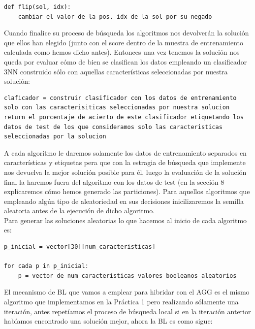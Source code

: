 \documentclass[10pt,a4paper]{article}
\begin{document}
\begin{lstlisting}
def flip(sol, idx):
	cambiar el valor de la pos. idx de la sol por su negado
\end{lstlisting}

Cuando finalice su proceso de búsqueda los algoritmos nos devolverán la solución que ellos han elegido (junto con el score dentro de la muestra de entrenamiento calculada como hemos dicho antes). Entonces una vez tenemos la solución nos queda por evaluar cómo de bien se clasifican los datos empleando un clasificador 3NN construido sólo con aquellas características seleccionadas por nuestra solución:\\

\begin{lstlisting}
claficador = construir clasificador con los datos de entrenamiento solo con las caracterisiticas seleccionadas por nuestra solucion
return el porcentaje de acierto de este clasificador etiquetando los datos de test de los que consideramos solo las caracteristicas seleccionadas por la solucion
\end{lstlisting}

A cada algoritmo le daremos solamente los datos de entrenamiento separados en características y etiquetas pera que con la estragia de búsqueda que implemente nos devuelva la mejor solución posible para él, luego la evaluación de la solución final la haremos fuera del algoritmo con los datos de test (en la sección 8 explicaremos cómo hemos generado las particiones). Para aquellos algoritmos que empleando algún tipo de aleatoriedad en sus decisiones inicilizaremos la semilla aleatoria antes de la ejecución de dicho algoritmo.\\

Para generar las soluciones aleatorias lo que hacemos al inicio de cada algoritmo es:\\

\begin{lstlisting}
p_inicial = vector[30][num_caracteristicas]

for cada p in p_inicial:
	p = vector de num_caracteristicas valores booleanos aleatorios
\end{lstlisting}

El mecanismo de BL que vamos a emplear para hibridar con el AGG es el mismo algoritmo que implementamos en la Práctica 1 pero realizando sólamente una iteración, antes repetíamos el proceso de búsqueda local si en la iteración anterior habíamos encontrado una solución mejor, ahora la BL es como sigue:\\
\end{document}
